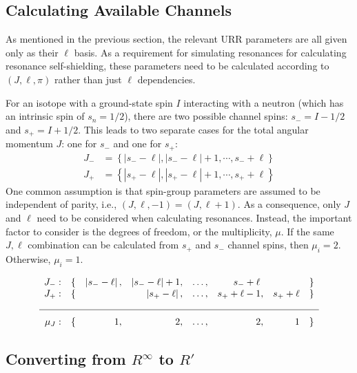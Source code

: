     \subsection{Calculating Available Channels}

    As mentioned in the previous section, the relevant URR parameters are all given only as their $\ell$ basis. As a requirement for simulating resonances for calculating resonance self-shielding, these parameters need to be calculated according to $(J,\ell,\pi)$ rather than just $\ell$ dependencies.

    For an isotope with a ground-state spin $I$ interacting with a neutron (which has an intrinsic spin of $s_n = 1/2$), there are two possible channel spins: $s_{-} = I - 1/2$ and $s_{+} = I + 1/2$. This leads to two separate cases for the total angular momentum $J$: one for $s_{-}$ and one for $s_{+}$:
    \begin{align}
        J_{-} &= \left\{ \left|s_{-} - \ell\right|, \left|s_{-} - \ell\right| + 1, \cdots, s_{-} + \ell \right\}\\
        J_{+} &= \left\{ \left|s_{+} - \ell\right|, \left|s_{+} - \ell\right| + 1, \cdots, s_{+} + \ell \right\}
    \end{align}
    One common assumption is that spin-group parameters are assumed to be independent of parity, i.e., $(J, \ell, -1) = (J, \ell +1)$. As a consequence, only $J$ and $\ell$ need to be considered when calculating resonances. Instead, the important factor to consider is the degrees of freedom, or the multiplicity, $\mu$. If the same $J,\ell$ combination can be calculated from $s_{+}$ and $s_{-}$ channel spins, then $\mu_i = 2$. Otherwise, $\mu_i=1$.

    \begin{equation}
        \begin{array}{rrrrrrrr}
J_{-}: & \{ & \left|s_{-} - \ell\right|, & \left|s_{-} - \ell\right| + 1, & \dots, & s_{-} + \ell ~ & & \} \\
J_{+}: & \{ & & \left|s_{+} - \ell\right|, & \dots, & s_{+} + \ell-1, & s_{+} + \ell & \} \\[1em] \hline \\[-0.5em]
\mu_J: & \{& 1, & 2, & \dots, & 2, & 1 & \} \\
\end{array}
    \end{equation}

    \subsection{Converting from $R^\infty$ to $R'$}

